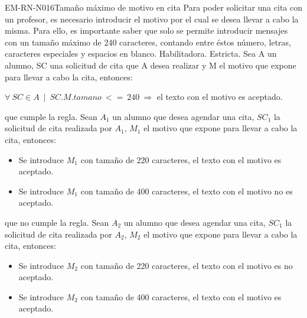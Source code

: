 \begin{BussinesRule}{EM-RN-N016}{Tamaño máximo de motivo en cita}
	\BRitem[Descripción:] Para poder solicitar una cita con un profesor, es necesario introducir el motivo por el cual se desea llevar a cabo la misma. Para ello, es importante saber que solo se permite introducir mensajes con un tamaño máximo de 240 caracteres, contando entre éstos número, letras, caracteres especiales y espacios en blanco.  
	\BRitem[Tipo: ] Habilitadora.
	\BRitem[Nivel: ] Estricta.
	\BRitem[Sentencia : ] Sea A un alumno, SC una solicitud de cita que A desea realizar y M el motivo que expone para llevar a cabo la cita, entonces:
	\begin{center}
		$\forall \: SC \in A \: \mid \: SC.M.tamano \: <= \: 240 \: \Rightarrow$ el texto con el motivo es aceptado.
	\end{center}
	 que cumple la regla.
		Sean $A_{1}$ un alumno que desea agendar una cita, $SC_{1}$ la solicitud de cita realizada por $A_{1}$, $M_{1}$ el motivo que expone para llevar a cabo la cita, entonces:
		\begin{itemize}
			\item Se introduce $M_{1}$ con tamaño de 220 caracteres, el texto con el motivo es aceptado.
			\item Se introduce $M_{1}$ con tamaño de 400 caracteres, el texto con el motivo no es aceptado.
		\end{itemize}
	 que no cumple la regla.
		Sean $A_{2}$ un alumno que desea agendar una cita, $SC_{1}$ la solicitud de cita realizada por $A_{2}$, $M_{2}$ el motivo que expone para llevar a cabo la cita, entonces:
		\begin{itemize}
			\item Se introduce $M_{2}$ con tamaño de 220 caracteres, el texto con el motivo es no aceptado.
			\item Se introduce $M_{2}$ con tamaño de 400 caracteres, el texto con el motivo es aceptado.
		\end{itemize}

\end{BussinesRule}

